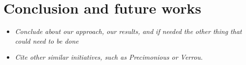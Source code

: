 \documentclass[a4paper,11pt]{article}
\let\cite=\supercite
\begin{document}
\section{Conclusion and future works}
\begin{itemize}
  \item \emph{Conclude about our approach, our results, and if needed the other thing that could need to be done}
  \item \emph{Cite other similar initiatives, such as Precimonious\cite{Rubio-Gonzalez2013} or Verrou\cite{fevotte2016verrou}.}
\end{itemize}



\newpage
\printbibliography
\end{document}

